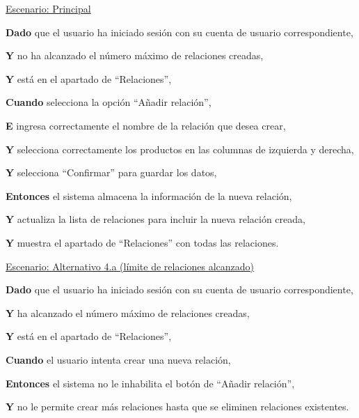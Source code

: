 \underline{Escenario: Principal}\par
\vspace{0.15cm}
\textbf{Dado} que el usuario ha iniciado sesión con su cuenta de usuario correspondiente,\par
\textbf{Y} no ha alcanzado el número máximo de relaciones creadas,\par
\textbf{Y} está en el apartado de \enquote{Relaciones},\par
\textbf{Cuando} selecciona la opción \enquote{Añadir relación},\par
\textbf{E} ingresa correctamente el nombre de la relación que desea crear,\par
\textbf{Y} selecciona correctamente los productos en las columnas de izquierda y derecha,\par
\textbf{Y} selecciona \enquote{Confirmar} para guardar los datos,\par
\textbf{Entonces} el sistema almacena la información de la nueva relación,\par
\textbf{Y} actualiza la lista de relaciones para incluir la nueva relación creada,\par
\textbf{Y} muestra el apartado de \enquote{Relaciones} con todas las relaciones.\par

\vspace{0.20cm}

\underline{Escenario: Alternativo 4.a (límite de relaciones alcanzado)}\par
\vspace{0.15cm}
\textbf{Dado} que el usuario ha iniciado sesión con su cuenta de usuario correspondiente,\par
\textbf{Y} ha alcanzado el número máximo de relaciones creadas,\par
\textbf{Y} está en el apartado de \enquote{Relaciones},\par
\textbf{Cuando} el usuario intenta crear una nueva relación,\par
\textbf{Entonces} el sistema no le inhabilita el botón de \enquote{Añadir relación},\par
\textbf{Y} no le permite crear más relaciones hasta que se eliminen relaciones existentes.\par

\vspace{0.20cm}
\newpage %

